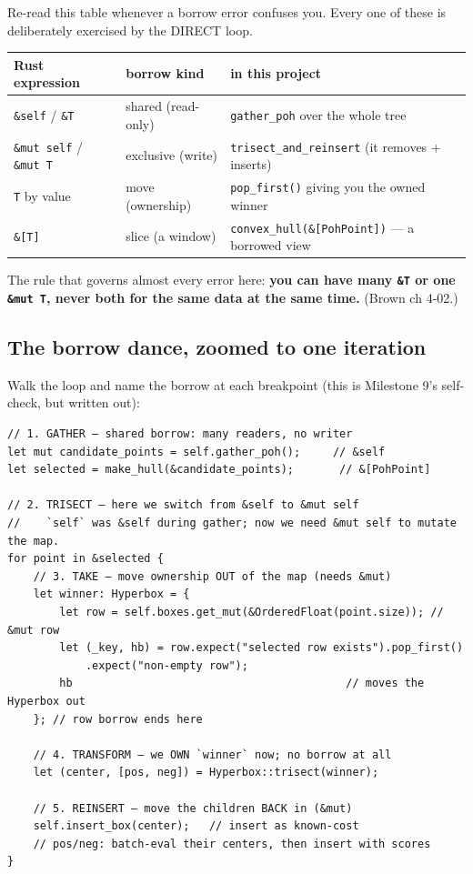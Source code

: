 \documentclass[11pt]{article}
\begin{document}
Re-read this table whenever a borrow error confuses you. Every one of these is
deliberately exercised by the DIRECT loop.

\begin{center}
\begin{tabular}{lll}
Rust expression & borrow kind & in this project\\
\hline
\texttt{\&self} / \texttt{\&T} & shared (read-only) & \texttt{gather\_poh} over the whole tree\\
\texttt{\&mut self} / \texttt{\&mut T} & exclusive (write) & \texttt{trisect\_and\_reinsert} (it removes + inserts)\\
\texttt{T} by value & move (ownership) & \texttt{pop\_first()} giving you the owned winner\\
\texttt{\&[T]} & slice (a window) & \texttt{convex\_hull(\&[PohPoint])} — a borrowed view\\
\end{tabular}
\end{center}

The rule that governs almost every error here: \textbf{\textbf{you can have many \texttt{\&T} or one
\texttt{\&mut T}, never both for the same data at the same time.}} (Brown ch 4-02.)
\subsection{The borrow dance, zoomed to one iteration}
\label{sec:org7e223e8}

Walk the loop and name the borrow at each breakpoint (this is Milestone 9's
self-check, but written out):

\begin{verbatim}
// 1. GATHER — shared borrow: many readers, no writer
let mut candidate_points = self.gather_poh();     // &self
let selected = make_hull(&candidate_points);       // &[PohPoint]

// 2. TRISECT — here we switch from &self to &mut self
//    `self` was &self during gather; now we need &mut self to mutate the map.
for point in &selected {
    // 3. TAKE — move ownership OUT of the map (needs &mut)
    let winner: Hyperbox = {
        let row = self.boxes.get_mut(&OrderedFloat(point.size)); // &mut row
        let (_key, hb) = row.expect("selected row exists").pop_first()
            .expect("non-empty row");
        hb                                          // moves the Hyperbox out
    }; // row borrow ends here

    // 4. TRANSFORM — we OWN `winner` now; no borrow at all
    let (center, [pos, neg]) = Hyperbox::trisect(winner);

    // 5. REINSERT — move the children BACK in (&mut)
    self.insert_box(center);   // insert as known-cost
    // pos/neg: batch-eval their centers, then insert with scores
}
\end{verbatim}
\end{document}
